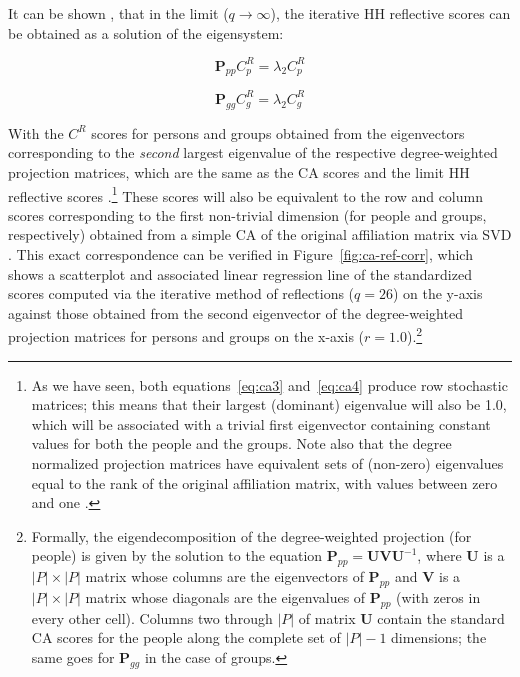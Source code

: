 \documentclass[a4paper,fleqn]{cas-sc}
\begin{document}
It can be shown \citep{van2021correspondence}, that in the limit ($q \rightarrow \infty$), the iterative HH reflective scores can be obtained as a solution of the eigensystem:

\begin{equation}
    \mathbf{P}_{pp}C^R_p = \lambda_2C^R_p
    \label{eq:dam1}
\end{equation}

\begin{equation}
    \mathbf{P}_{gg}C^R_g = \lambda_2C^R_g
    \label{eq:dam2}
\end{equation}

With the $C^R$ scores for persons and groups obtained from the eigenvectors corresponding to the \textit{second} largest eigenvalue of the respective degree-weighted projection matrices, which are the same as the CA scores and the limit HH reflective scores \citep{van2021correspondence}.\footnote{As we have seen, both equations~\ref{eq:ca3} and~\ref{eq:ca4} produce row stochastic matrices; this means that their largest (dominant) eigenvalue will also be 1.0, which will be associated with a trivial first eigenvector containing constant values for both the people and the groups. Note also that the degree normalized projection matrices have equivalent sets of (non-zero) eigenvalues equal to the rank of the original affiliation matrix, with values between zero and one \citep{van2021correspondence}.} These scores will also be equivalent to the row and column scores corresponding to the first non-trivial dimension (for people and groups, respectively) obtained from a simple CA of the original affiliation matrix via SVD \citep[398, eq. 9.17]{fouss2016algorithms}. This exact correspondence can be verified in Figure~\ref{fig:ca-ref-corr}, which shows a scatterplot and associated linear regression line of the standardized scores computed via the iterative method of reflections ($q = 26$) on the y-axis against those obtained from the second eigenvector of the degree-weighted projection matrices for persons and groups on the x-axis ($r = 1.0$).\footnote{Formally, the eigendecomposition of the degree-weighted projection (for people) is given by the solution to the equation $\mathbf{P}_{pp} = \mathbf{UVU}^{-1}$, where $\mathbf{U}$ is a $|P| \times |P|$ matrix whose columns are the eigenvectors of $\mathbf{P}_{pp}$ and $\mathbf{V}$ is a $|P| \times |P|$ matrix whose diagonals are the eigenvalues of $\mathbf{P}_{pp}$ (with zeros in every other cell). Columns two through $|P|$ of matrix $\mathbf{U}$ contain the standard CA scores for the people along the complete set of $|P| - 1$ dimensions; the same goes for $\mathbf{P}_{gg}$ in the case of groups.}
\end{document}
